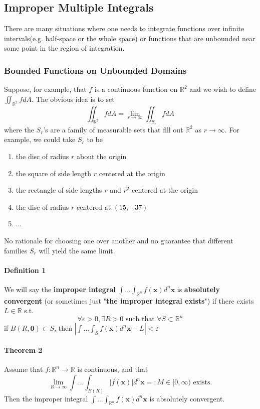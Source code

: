 \documentclass[11pt]{article}
\newcommand{\tb}[1]{\textbf{#1}}
\newcommand{\real}[0]{\mathbb{R}}
\newcommand{\vx}[0]{\tb{x}}
\newcommand{\vo}[0]{\tb{0}}
\begin{document}
\subsection{Improper Multiple Integrals}
There are many situations where one needs to integrate functions over infinite intervals(e.g. half-space or the whole space) or functions that are unbounded near some point in the region of integration. 
\subsubsection{Bounded Functions on Unbounded Domains}
Suppose, for example, that $f$ is a continuous function on $\real^2$ and we wish to define $\iint_{\real^2}fdA$. The obvious idea is to set $$\iint_{\real^2} fdA = \underset{r\rightarrow\infty}{\lim} \iint_{S_r}fdA$$ where the $S_r$'s are a family of measurable sets that fill out $\real^2$ as $r \rightarrow \infty$. For example, we could take $S_r$ to be 
\begin{enumerate}
    \item the disc of radius $r$ about the origin
    \item the square of side length $r$ centered at the origin
    \item the rectangle of side lengths $r$ and $r^2$ centered at the origin
    \item the disc of radius $r$ centered at $(15, -37)$
    \item $\hdots$
\end{enumerate}
No rationale for choosing one over another and no guarantee that different families $S_r$ will yield the same limit.
\paragraph{Definition 1} We will say the \tb{improper integral} $\int \hdots \int_{\real^n} f(\vx)d^n\vx$ is \tb{absolutely convergent} (or sometimes just "\tb{the improper integral exists}") if there exists $L \in \real$ s.t.
$$\forall \varepsilon >0, \exists R > 0 \mbox{ such that } \forall S \subset \real^n$$
if $B(R, \vo) \subset S$, then $|\int \hdots \int_S f(\vx) d^n\vx - L| < \varepsilon$

\paragraph{Theorem 2} Assume that $f: \real^n \rightarrow \real$ is continuous, and that
$$\underset{R \rightarrow \infty}{\lim} \int \hdots \int_{B(R)} |f(\vx)|d^n\vx =: M \in [0, \infty) \mbox{ exists.}$$
Then the improper integral $\int \hdots \int_{\real^n}f(\vx)d^n\vx$ is absolutely convergent.
\end{document}
